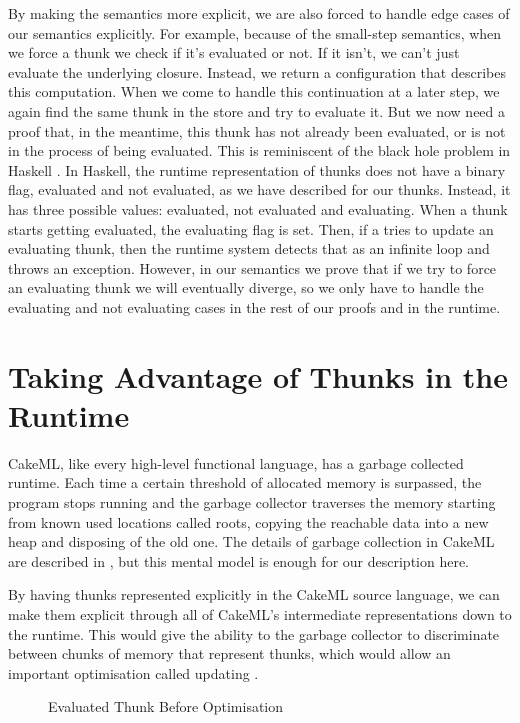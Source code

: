 By making the semantics more explicit, we are also forced to handle edge cases
of our semantics explicitly. For example, because of the small-step semantics,
when we force a thunk we check if it's evaluated or not. If it isn't, we can't
just evaluate the underlying closure. Instead, we return a configuration that
describes this computation. When we come to handle this continuation at a later
step, we again find the same thunk in the store and try to evaluate it. But we
now need a proof that, in the meantime, this thunk has not already been
evaluated, or is not in the process of being evaluated. This is reminiscent of
the black hole problem in Haskell \cite{van1999optimising}. In Haskell, the
runtime representation of thunks does not have a binary flag, evaluated and not
evaluated, as we have described for our thunks. Instead, it has three possible
values: evaluated, not evaluated and evaluating. When a thunk starts getting
evaluated, the evaluating flag is set. Then, if a  tries to update an
evaluating thunk, then the runtime system detects that as an infinite loop and
throws an exception. However, in our semantics we prove that if we try to force
an evaluating thunk we will eventually diverge, so we only have to handle the
evaluating and not evaluating cases in the rest of our proofs and in the
runtime.

\section{Taking Advantage of Thunks in the Runtime}

CakeML, like every high-level functional language, has a garbage collected
runtime. Each time a certain threshold of allocated memory is surpassed, the
program stops running and the garbage collector traverses the memory starting
from known used locations called roots, copying the reachable data into a new
heap and disposing of the old one. The details of garbage collection in CakeML
are described in \cite{sandberg2019verified}, but this mental model is enough
for our description here.

By having thunks represented explicitly in the CakeML source language, we can
make them explicit through all of CakeML's intermediate representations down to
the runtime. This would give the ability to the garbage collector to
discriminate between chunks of memory that represent thunks, which would allow
an important optimisation called updating \cite{seward1992generational}.

\begin{figure}[h]
  \centering
  \caption{Evaluated Thunk Before Optimisation}
  \label{fig:thunk}
\end{figure}

